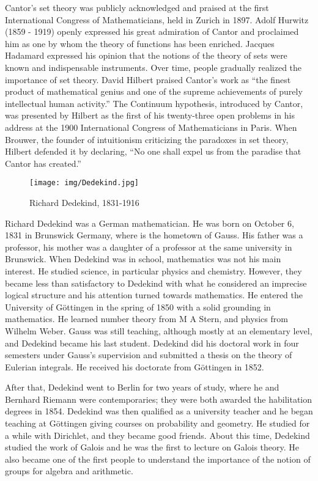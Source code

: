 \documentclass{article}
\begin{document}
Cantor's set theory was publicly acknowledged and praised at the first International Congress of Mathematicians, held in Zurich in 1897. Adolf Hurwitz (1859 - 1919) openly expressed his great admiration of Cantor and proclaimed him as one by whom the theory of functions has been enriched. Jacques Hadamard expressed his opinion that the notions of the theory of sets were known and indispensable instruments. Over time, people gradually realized the importance of set theory. David Hilbert praised Cantor's work as ``the finest product of mathematical genius and one of the supreme achievements of purely intellectual human activity.'' The Continuum hypothesis, introduced by Cantor, was presented by Hilbert as the first of his twenty-three open problems in his address at the 1900 International Congress of Mathematicians in Paris. When Brouwer, the founder of intuitionism criticizing the paradoxes in set theory, Hilbert defended it by declaring, ``No one shall expel us from the paradise that Cantor has created.''

\begin{wrapfigure}{L}{0.4\textwidth}
 \centering
 \texttt{[image: img/Dedekind.jpg]}
 \captionsetup{labelformat=empty}
 \caption{Richard Dedekind, 1831-1916}
 \label{fig:Dedekind}
\end{wrapfigure}

Richard Dedekind was a German mathematician. He was born on October 6, 1831 in Brunswick Germany, where is the hometown of Gauss. His father was a professor, his mother was a daughter of a professor at the same university in Brunswick. When Dedekind was in school, mathematics was not his main interest. He studied science, in particular physics and chemistry. However, they became less than satisfactory to Dedekind with what he considered an imprecise logical structure and his attention turned towards mathematics. He entered the University of Göttingen in the spring of 1850 with a solid grounding in mathematics. He learned number theory from M A Stern, and physics from Wilhelm Weber. Gauss was still teaching, although mostly at an elementary level, and Dedekind became his last student. Dedekind did his doctoral work in four semesters under Gauss's supervision and submitted a thesis on the theory of Eulerian integrals. He received his doctorate from Göttingen in 1852.

After that, Dedekind went to Berlin for two years of study, where he and Bernhard Riemann were contemporaries; they were both awarded the habilitation degrees in 1854. Dedekind was then qualified as a university teacher and he began teaching at Göttingen giving courses on probability and geometry. He studied for a while with Dirichlet, and they became good friends. About this time, Dedekind studied the work of Galois and he was the first to lecture on Galois theory. He also became one of the first people to understand the importance of the notion of groups for algebra and arithmetic.
\end{document}
